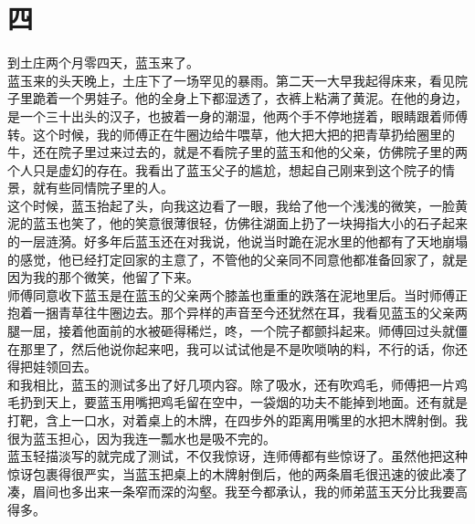 \fancyhead[RO]{\thepage} %
\fancyhead[LE]{\thepage} %
\fancyfoot[LE,RO]{}
\fancyfoot[LO,CE]{}
\fancyfoot[CO,RE]{}
\chapter*{四}
到土庄两个月零四天，蓝玉来了。
\\

蓝玉来的头天晚上，土庄下了一场罕见的暴雨。第二天一大早我起得床来，看见院子里跪着一个男娃子。他的全身上下都湿透了，衣裤上粘满了黄泥。在他的身边，是一个三十出头的汉子，也披着一身的潮湿，他两个手不停地搓着，眼睛跟着师傅转。这个时候，我的师傅正在牛圈边给牛喂草，他大把大把的把青草扔给圈里的牛，还在院子里过来过去的，就是不看院子里的蓝玉和他的父亲，仿佛院子里的两个人只是虚幻的存在。我看出了蓝玉父子的尴尬，想起自己刚来到这个院子的情景，就有些同情院子里的人。
\\

这个时候，蓝玉抬起了头，向我这边看了一眼，我给了他一个浅浅的微笑，一脸黄泥的蓝玉也笑了，他的笑意很薄很轻，仿佛往湖面上扔了一块拇指大小的石子起来的一层涟漪。好多年后蓝玉还在对我说，他说当时跪在泥水里的他都有了天地崩塌的感觉，他已经打定回家的主意了，不管他的父亲同不同意他都准备回家了，就是因为我的那个微笑，他留了下来。
\\

师傅同意收下蓝玉是在蓝玉的父亲两个膝盖也重重的跌落在泥地里后。当时师傅正抱着一捆青草往牛圈边去。那个异样的声音至今还犹然在耳，我看见蓝玉的父亲两腿一屈，接着他面前的水被砸得稀烂，咚，一个院子都颤抖起来。师傅回过头就僵在那里了，然后他说你起来吧，我可以试试他是不是吹唢呐的料，不行的话，你还得把娃领回去。
\\

和我相比，蓝玉的测试多出了好几项内容。除了吸水，还有吹鸡毛，师傅把一片鸡毛扔到天上，要蓝玉用嘴把鸡毛留在空中，一袋烟的功夫不能掉到地面。还有就是打靶，含上一口水，对着桌上的木牌，在四步外的距离用嘴里的水把木牌射倒。我很为蓝玉担心，因为我连一瓢水也是吸不完的。\\

蓝玉轻描淡写的就完成了测试，不仅我惊讶，连师傅都有些惊讶了。虽然他把这种惊讶包裹得很严实，当蓝玉把桌上的木牌射倒后，他的两条眉毛很迅速的彼此凑了凑，眉间也多出来一条窄而深的沟壑。我至今都承认，我的师弟蓝玉天分比我要高得多。
\\

